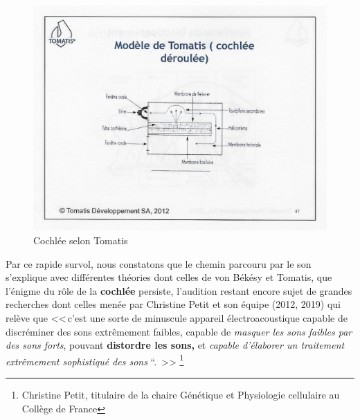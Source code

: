 \begin{figure}
	\centering
	\includegraphics[width=1.0\linewidth]{images/Cochleederoule_haut.jpg}
	\caption[Cochlée selon Tomatis]{Cochlée selon Tomatis}
	\label{fig:cochleederoulehaut}
\end{figure}
Par ce rapide survol, nous constatons que  le 
chemin 
parcouru par 
le son s'explique avec différentes théories  dont celles de von Békésy et 
Tomatis, que l'énigme du rôle de la \textbf{cochlée}  persiste, l'audition restant  encore sujet de grandes 
recherches dont celles menée par Christine Petit  et son équipe (2012, 
2019)%
qui relève que 
<<\,c'est une sorte de minuscule appareil électroacoustique capable
de discréminer des sons extrêmement faibles, capable de \emph{masquer
	les sons faibles par des sons forts}, pouvant \textbf{distordre les
	sons,} et \emph{capable d'élaborer un traitement extrêmement
	sophistiqué des sons} ``. \,>> \autocite{petit_lookscience}   \footnote{Christine Petit, titulaire de la 
	chaire Génétique et
	Physiologie cellulaire au Collège de France}


